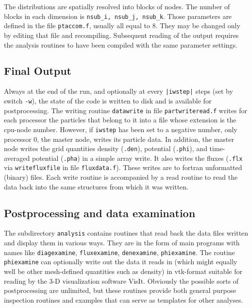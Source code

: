 \documentclass[12pt]{article}
\begin{document}
The distributions are spatially resolved into blocks of nodes. The
number of blocks in each dimension is \verb!nsub_i, nsub_j, nsub_k!. 
Those parameters are defined in the file \verb!ptaccom.f!, usually all
equal to 8. They may be changed only by editing that file and
recompiling. Subsequent reading of the output requires the analysis
routines to have been compiled with the same parameter settings.


\subsection{Final Output}

Always at the end of the run, and optionally at every \verb!|iwstep|!
steps (set by switch \verb!-w!), the state of the code is written to
disk and is available for postprocessing. The writing routine
\verb!datawrite! in file \verb!partwriteread.f! writes for each
processor the particles that belong to it into a file whose extension
is the cpu-node number. However, if \verb!iwstep! has been set
to a negative number, only processor 0, the master
node, writes its particle data. In addition, the master node writes
the grid quantities density (\verb!.den!), potential (\verb!.phi!),
and time-averaged potential (\verb!.pha!) in a simple array write. It
also writes the fluxes (\verb!.flx! via \verb!writefluxfile! in file
\verb!fluxdata.f!). These writes are to fortran unformatted (binary)
files. Each write routine is accompanied by a read routine to read the
data back into the same structures from which it was written.

\subsection{Postprocessing and data examination}

The subdirectory \verb!analysis! contains routines that read back the
data files written and display them in various ways. They are in the
form of main programs with names like \verb!diagexamine!,
\verb!fluxexamine!, \verb!denexamine!, \verb!phiexamine!. 
The routine \verb!phiexamine! can optionally write out the data it
reads in (which might equally well be other mesh-defined quantities
such as density) in vtk-format suitable for reading by the 3-D
visualization software VisIt. 
Obviously the possible sorts of postprocessing are unlimited, but
these routines provide both general purpose inspection routines and
examples that can serve as templates for other analyses.
\end{document}
